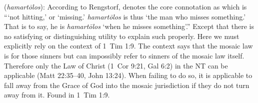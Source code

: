 \item[Sinner,]

(\textit{hamartōlos}):
According to Rengstorf,  denotes the core connotation as  which is ```not hitting,' or `missing.' \emph{hamartōlos} is thus `the man who misses something.' That is to say, he is \emph{hamartōlos} `when he misses something'.'' 
Except that there is no satisfying or distinguishing utility to explain such properly. Here we must explicitly rely on the context of 1~Tim 1:9. The context says that the mosaic law is for those sinners but can impossibly refer to sinners of the mosaic law itself. Therefore only the Law of Christ (1~Cor 9:21, Gal 6:2) in the NT can be applicable (Matt 22:35--40, John 13:24). When failing to do so, it is applicable to fall away from the Grace of God into the mosaic jurisdiction if they do not turn away from it.
Found in 1~Tim 1:9.
